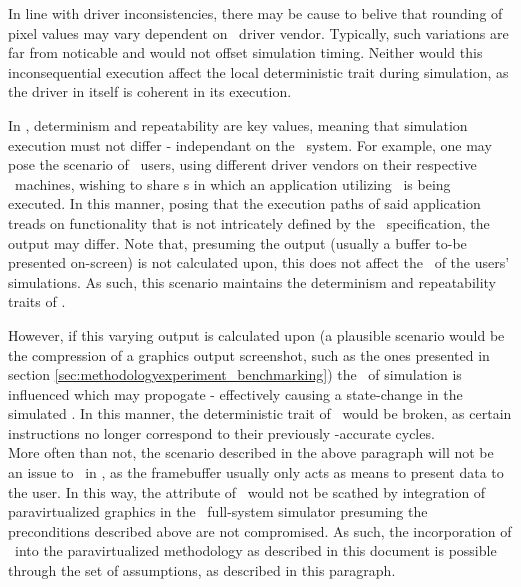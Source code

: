 In line with driver inconsistencies, there may be cause to belive that rounding of pixel values may vary dependent on \dvttermhost\ driver vendor.
Typically, such variations are far from noticable and would not offset simulation timing.
Neither would this inconsequential execution affect the local deterministic trait during simulation, as the driver in itself is coherent in its execution.

In \dvttermsimics , determinism and repeatability are key values, meaning that simulation execution must not differ - independant on the \dvttermhost\ system.
For example, one may pose the scenario of \dvttermsimics\ users, using different driver vendors on their respective \dvttermhost\ machines, wishing to share \dvttermcheckpoint s in which an application utilizing \dvttermopengles\ is being executed.
In this manner, posing that the execution paths of said application treads on functionality that is not intricately defined by the \dvttermopengles\ specification, the output may differ.
Note that, presuming the output (usually a buffer to-be presented on-screen) is not calculated upon, this does not affect the \dvttermtiming\ of the users' simulations.
As such, this scenario maintains the determinism and repeatability traits of \dvttermsimics .

However, if this varying output is calculated upon (a plausible scenario would be the compression of a graphics output screenshot, such as the ones presented in section \ref{sec:methodologyexperiment_benchmarking}) the \dvttermtiming\ of simulation is influenced which may propogate - effectively causing a state-change in the simulated \dvttermcpu .
In this manner, the deterministic trait of \dvttermsimics\ would be broken, as certain instructions no longer correspond to their previously \dvttermtiming -accurate cycles.\\

\noindent
More often than not, the scenario described in the above paragraph will not be an issue to \dvttermdeterministicexecution\ in \dvttermsimics , as the framebuffer usually only acts as means to present data to the user.
In this way, the attribute of \dvttermdeterministicexecution\ would not be scathed by integration of paravirtualized graphics in the \dvttermsimics\ full-system simulator presuming the preconditions described above are not compromised.
As such, the incorporation of \dvttermdeterministicexecution\ into the paravirtualized methodology as described in this document is possible through the set of assumptions, as described in this paragraph.

